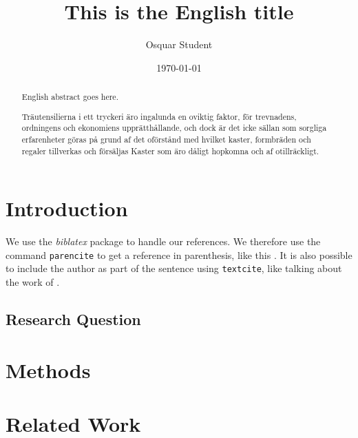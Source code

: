 \documentclass{kththesis}
\title{This is the English title}
\author{Osquar Student}
\date{\today}
\begin{document}
\frontmatter

\titlepage

\begin{abstract}
  English abstract goes here.

  \blindtext
\end{abstract}


\begin{otherlanguage}{swedish}
  \begin{abstract}
    Träutensilierna i ett tryckeri äro ingalunda en oviktig faktor,
    för trevnadens, ordningens och ekonomiens upprätthållande, och
    dock är det icke sällan som sorgliga erfarenheter göras på grund
    af det oförstånd med hvilket kaster, formbräden och regaler
    tillverkas och försäljas Kaster som äro dåligt hopkomna och af
    otillräckligt.
  \end{abstract}
\end{otherlanguage}


\tableofcontents


\mainmatter


\chapter{Introduction}

We use the \emph{biblatex} package to handle our references.  We therefore use the
command \texttt{parencite} to get a reference in parenthesis, like this
\parencite{Erdweg2013}.  It is also possible to include the author
as part of the sentence using \texttt{textcite}, like talking about
the work of \textcite{Erdweg2013}.

\Blindtext

\section{Research Question}

\blindtext

\chapter{Methods}

\blindtext

\chapter{Related Work}
\end{document}
